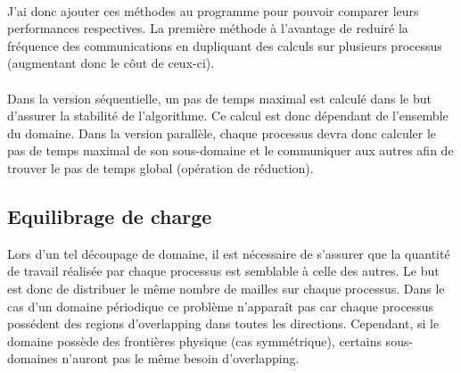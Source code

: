 \paragraph{}J'ai donc ajouter ces méthodes au programme pour pouvoir comparer leurs performances respectives. La première méthode à l'avantage de reduiré la fréquence des communications en dupliquant des calculs sur plusieurs processus (augmentant donc le côut de ceux-ci).


\paragraph{}Dans la version séquentielle, un pas de temps maximal est calculé dans le but d'assurer la stabilité de l'algorithme. Ce calcul est donc dépendant de l'ensemble du domaine. Dans la version parallèle, chaque processus devra donc calculer le pas de temps maximal de son sous-domaine et le communiquer aux autres afin de trouver le pas de temps global (opération de réduction).




\subsection{Equilibrage de charge}
Lors d'un tel découpage de domaine, il est nécessaire de s'assurer que la quantité de travail réalisée par chaque processus est semblable à celle des autres. Le but est donc de distribuer le même nombre de mailles sur chaque processus. Dans le cas d'un domaine périodique ce problème n'apparaît pas car chaque processus possédent des regions d'overlapping dans toutes les directions. Cependant, si le domaine possède des frontières physique (cas symmétrique), certains sous-domaines n'auront pas le même besoin d'overlapping.

